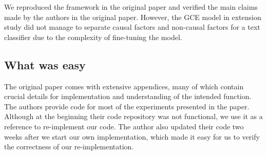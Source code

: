 
We reproduced the framework in the original paper and verified the main claims made by the authors in the original paper. However, the GCE model in extension study did not manage to separate causal factors and non-causal factors for a text classifier due to the complexity of fine-tuning the model.


\subsection*{What was easy}
The original paper comes with extensive appendices, many of which contain crucial details for implementation and understanding of the intended function. The authors provide code for most of the experiments presented in the paper. Although at the beginning their code repository was not functional, we use it as a reference to re-implement our code. The author also updated their code two weeks after we start our own implementation, which made it easy for us to verify the correctness of our re-implementation.

